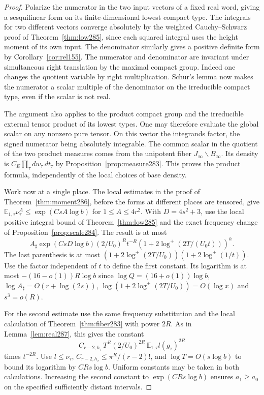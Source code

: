 \documentclass[a4paper,11pt]{article}
\theoremstyle{definition}
\theoremstyle{remark}
\numberwithin{equation}{section}
\begin{document}
\begin{proof}
Polarize the numerator in the two input vectors of a fixed
real word, giving a sesquilinear form on its finite-dimensional
lowest compact type. The integrals for two different vectors
converge absolutely by the weighted Cauchy--Schwarz proof of
Theorem~\ref{thm:low285}, since each squared integral
uses the height moment of its own input. The denominator
similarly gives a positive definite form by
Corollary~\ref{cor:rel155}. The numerator and denominator are
invariant under simultaneous right translation by the maximal
compact group. Indeed one changes the quotient variable by
right multiplication. Schur's lemma now makes the numerator
a scalar multiple of the denominator on the irreducible
compact type, even if the scalar is not real.

The argument also applies to the product compact group and
the irreducible external tensor product of its lowest types.
One may therefore evaluate the global scalar on any nonzero
pure tensor. On this vector the integrands factor, the signed
numerator being absolutely integrable. The common scalar in
the quotient of the two product measures comes from the
unipotent fiber \(J_\infty\backslash B_\infty\). Its density
is \(C_E\prod_\tau dw_\tau\,dt_\tau\) by
Proposition~\ref{prop:measure283}. This proves the product
formula, independently of the local choices of base density.

Work now at a single place. The local estimates in the
proof of Theorem~\ref{thm:moment286}, before the forms at
different places are tensored, give
\(\mathbb E_{1,\tau}\nu_\tau^A\le\exp(CsA\log b)\)
for \(1\le A\le4r^2\). With \(D=4s^2+3\), use the local
positive integral bound of Theorem~\ref{thm:low285}
and the exact frequency change of
Proposition~\ref{prop:scale284}. The result is at most
\[
 A_\sharp\exp(CsD\log b)(2/U_0)^R t^{-R}
        (1+2\log^+(2T/(U_0t)))^h .
\]
The last parenthesis is at most
\((1+2\log^+(2T/U_0))(1+2\log^+(1/t))\).
Use the factor independent of \(t\) to define the first
constant. Its logarithm is at most
\(-(16-o(1))R\log b\) since \(\log Q=(16+o(1))\log b\),
\(\log A_\sharp=O(r+\log(2s))\),
\(\log(1+2\log^+(2T/U_0))=O(\log x)\) and
\(s^3=o(R)\).

For the second estimate use the same frequency substitution
and the local calculation of Theorem~\ref{thm:fiber283}
with power \(2R\). As in Lemma~\ref{lem:real287}, this
gives the constant
\[
     C_{r-2,h_\tau}\,T^R(2/U_0)^{2R}\,
                       \mathbb E_{1,\tau} l(g_\tau)^{2R}
\]
times \(t^{-2R}\). Use \(l\le\nu_\tau\),
\(C_{r-2,h_\tau}\le\pi^R/(r-2)!\),
and \(\log T=O(s\log b)\) to bound its logarithm by
\(C R s\log b\). Uniform constants may be taken in both
calculations. Increasing the second constant to
\(\exp(C R s\log b)\) ensures \(a_1\ge a_0\) on the
specified sufficiently distant intervals.
\end{proof}
\end{document}
